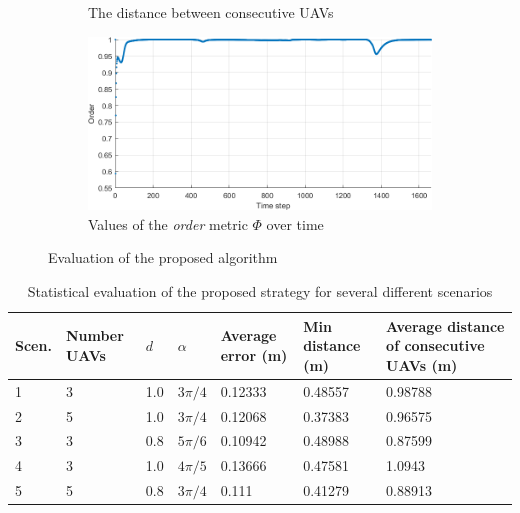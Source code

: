 \begin{figure}[t]
\begin{subfigure}[b]{0.495\textwidth}
    \caption{The distance between consecutive UAVs}
    \label{fig:chap2_mean}
    \end{subfigure}
    \begin{subfigure}[b]{0.495\textwidth}
    \includegraphics[width=\textwidth]{paper1/images/heading.png}
    \caption{Values of the \textit{order} metric $\Phi$ over time}
    \label{fig:chap2_heading}
    \end{subfigure}
    \caption{Evaluation of the proposed algorithm}
    \label{fig:chap2_eval}
\end{figure}

\begin{table}[!]
\centering
\caption{Statistical evaluation of the proposed strategy for several different scenarios}
\label{tbl:chap2_sta}
\begin{tabular}{C{0.8cm}C{1.5cm}C{1cm}C{1cm}C{2cm}C{2.5cm}C{4.0cm}}
\hline
Scen. & Number UAVs & $d$ & $\alpha$    & Average error (m) & Min distance (m) & Average distance of consecutive UAVs (m) \\      & 3        & 1.0   & $3\pi/4$             & 0.12333   & 0.48557   & 0.98788                      \\
2     & 5        & 1.0   & $3\pi/4$    & 0.12068   & 0.37383   & 0.96575                      \\
3     & 3        & 0.8   & $5\pi/6$    & 0.10942   & 0.48988   & 0.87599                      \\
4     & 3        & 1.0   & $4\pi/5$    & 0.13666   & 0.47581   & 1.0943                       \\
5     & 5        & 0.8   & $3\pi/4$    & 0.111     & 0.41279   & 0.88913     \\ \hline                
\end{tabular}
\end{table}

